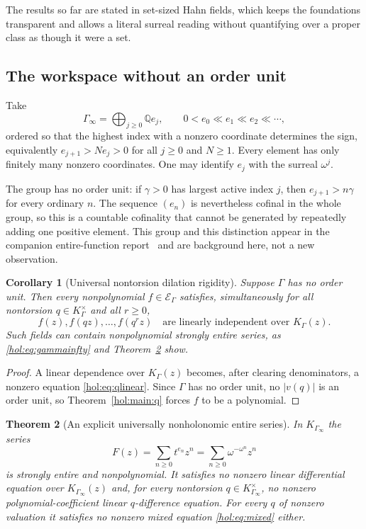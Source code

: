 \documentclass[11pt]{article}
\numberwithin{equation}{section}
\newtheorem{theorem}{Theorem}[section]
\newtheorem{corollary}[theorem]{Corollary}
\theoremstyle{definition}
\theoremstyle{remark}
\newcommand{\Q}{\mathbb Q}
\newcommand{\K}{K_\Gamma}
\newcommand{\E}{\mathcal E_\Gamma}
\newcommand{\abs}[1]{\lvert#1\rvert}
\begin{document}
The results so far are stated in set-sized Hahn fields, which keeps the
foundations transparent and allows a literal surreal reading without
quantifying over a proper class as though it were a set.

\subsection{The workspace without an order unit}

Take
\begin{equation}\label{hol:eq:gammainfty}
 \Gamma_\infty=\bigoplus_{j\ge0}\Q e_j,
 \qquad 0<e_0\ll e_1\ll e_2\ll\cdots,
\end{equation}
ordered so that the highest index with a nonzero coordinate determines the
sign, equivalently $e_{j+1}>Ne_j>0$ for all $j\ge0$ and $N\ge1$. Every element
has only finitely many nonzero coordinates. One may identify $e_j$ with the
surreal $\omega^j$.

The group has no order unit: if $\gamma>0$ has largest active index $j$, then
$e_{j+1}>n\gamma$ for every ordinary $n$. The sequence $(e_n)$ is nevertheless
cofinal in the whole group, so this is a countable cofinality that cannot be
generated by repeatedly adding one positive element. This group and this
distinction appear in the companion entire-function
report~\cite{repoentire} and are background here, not a new observation.

\begin{corollary}[Universal nontorsion dilation rigidity]
\label{hol:cor:universal}
Suppose $\Gamma$ has no order unit. Then every nonpolynomial $f\in\E$
satisfies, simultaneously for all nontorsion $q\in\K^\times$ and all $r\ge0$,
\[
 f(z),f(qz),\ldots,f(q^rz)\quad\text{are linearly independent over }\K(z).
\]
Such fields can contain nonpolynomial strongly entire series, as
\eqref{hol:eq:gammainfty} and Theorem~\ref{hol:thm:explicit} show.
\end{corollary}

\begin{proof}
A linear dependence over $\K(z)$ becomes, after clearing denominators, a
nonzero equation \eqref{hol:eq:qlinear}. Since $\Gamma$ has no order unit,
no $\abs{v(q)}$ is an order unit, so Theorem~\ref{hol:main:q} forces $f$ to be
a polynomial.
\end{proof}

\begin{theorem}[An explicit universally nonholonomic entire series]
\label{hol:thm:explicit}
In $K_{\Gamma_\infty}$ the series
\begin{equation}\label{hol:eq:explicitF}
 F(z)=\sum_{n\ge0}t^{e_n}z^n
     =\sum_{n\ge0}\omega^{-\omega^n}z^n
\end{equation}
is strongly entire and nonpolynomial. It satisfies no nonzero linear
differential equation over $K_{\Gamma_\infty}(z)$ and, for every nontorsion
$q\in K_{\Gamma_\infty}^\times$, no nonzero polynomial-coefficient linear
$q$-difference equation. For every $q$ of nonzero valuation it satisfies no
nonzero mixed equation \eqref{hol:eq:mixed} either.
\end{theorem}
\end{document}
